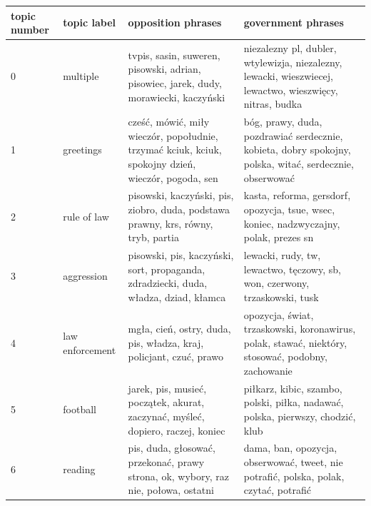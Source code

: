 \documentclass{article}
\begin{document}
	
	\begin{otherlanguage}{polish}
			
			\begin{longtable}{p{2cm}p{2cm}p{5cm}p{5cm}}
				

				\toprule
				topic number &              topic label &                                                                                               opposition phrases &                                                                                                      government phrases \\
				\midrule
				0 &                 multiple &                            tvpis, sasin, suweren, pisowski, adrian, pisowiec, jarek, dudy, morawiecki, kaczyński &                niezalezny pl, dubler, wtylewizja, niezalezny, lewacki, wieszwiecej, lewactwo, wieszwięcy, nitras, budka \\
				1 &                greetings &               cześć, mówić, miły wieczór, popołudnie, trzymać kciuk, kciuk, spokojny dzień, wieczór, pogoda, sen &                 bóg, prawy, duda, pozdrawiać serdecznie, kobieta, dobry spokojny, polska, witać, serdecznie, obserwować \\
				2 &              rule of law &                                pisowski, kaczyński, pis, ziobro, duda, podstawa prawny, krs, równy, tryb, partia &                                  kasta, reforma, gersdorf, opozycja, tsue, wsec, koniec, nadzwyczajny, polak, prezes sn \\
				3 &               aggression &                             pisowski, pis, kaczyński, sort, propaganda, zdradziecki, duda, władza, dziad, kłamca &                                              lewacki, rudy, tw, lewactwo, tęczowy, sb, won, czerwony, trzaskowski, tusk \\
				4 &          law enforcement &                                               mgła, cień, ostry, duda, pis, władza, kraj, policjant, czuć, prawo &                       opozycja, świat, trzaskowski, koronawirus, polak, stawać, niektóry, stosować, podobny, zachowanie \\
				5 &                 football &                                  jarek, pis, musieć, początek, akurat, zaczynać, myśleć, dopiero, raczej, koniec &                                         piłkarz, kibic, szambo, polski, piłka, nadawać, polska, pierwszy, chodzić, klub \\
				6 &                  reading &                               pis, duda, głosować, przekonać, prawy strona, ok, wybory, raz nie, połowa, ostatni &                                   dama, ban, opozycja, obserwować, tweet, nie potrafić, polska, polak, czytać, potrafić \\

\end{longtable}
\end{otherlanguage}
\end{document}
